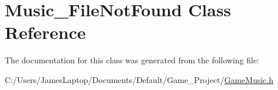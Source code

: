 \hypertarget{class_music___file_not_found}{}\section{Music\+\_\+\+File\+Not\+Found Class Reference}
\label{class_music___file_not_found}


The documentation for this class was generated from the following file\+:\begin{DoxyCompactItemize}
\item 
C\+:/\+Users/\+James\+Laptop/\+Documents/\+Default/\+Game\+\_\+\+Project/\hyperlink{_game_music_8h}{Game\+Music.\+h}\end{DoxyCompactItemize}
